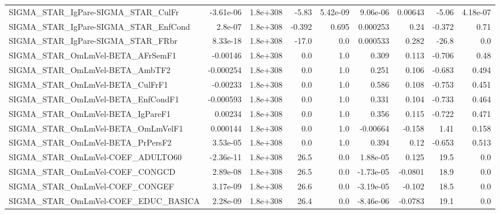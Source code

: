 \begin{tabular}{lrrrrrrrr}
SIGMA\_STAR\_IgPare-SIGMA\_STAR\_CulFr    &   -3.61e-06 &     1.8e+308 &   -5.83 & 5.42e-09 &   9.06e-06 &     0.00643 &        -5.06 &      4.18e-07 \\
SIGMA\_STAR\_IgPare-SIGMA\_STAR\_EnfCond  &     2.8e-07 &     1.8e+308 &  -0.392 &    0.695 &   0.000253 &        0.24 &       -0.372 &          0.71 \\
SIGMA\_STAR\_IgPare-SIGMA\_STAR\_FRbr     &    8.33e-18 &     1.8e+308 &   -17.0 &      0.0 &   0.000533 &       0.282 &        -26.8 &           0.0 \\
SIGMA\_STAR\_OmLmVel-BETA\_AFrSemF1      &    -0.00146 &     1.8e+308 &     0.0 &      1.0 &      0.309 &       0.113 &       -0.706 &          0.48 \\
SIGMA\_STAR\_OmLmVel-BETA\_AmbTF2        &   -0.000254 &     1.8e+308 &     0.0 &      1.0 &      0.251 &       0.106 &       -0.683 &         0.494 \\
SIGMA\_STAR\_OmLmVel-BETA\_CulFrF1       &    -0.00233 &     1.8e+308 &     0.0 &      1.0 &      0.586 &       0.108 &       -0.753 &         0.451 \\
SIGMA\_STAR\_OmLmVel-BETA\_EnfCondF1     &   -0.000593 &     1.8e+308 &     0.0 &      1.0 &      0.331 &       0.104 &       -0.733 &         0.464 \\
SIGMA\_STAR\_OmLmVel-BETA\_IgPareF1      &     0.00234 &     1.8e+308 &     0.0 &      1.0 &      0.356 &       0.115 &       -0.722 &         0.471 \\
SIGMA\_STAR\_OmLmVel-BETA\_OmLmVelF1     &    0.000144 &     1.8e+308 &     0.0 &      1.0 &   -0.00664 &      -0.158 &         1.41 &         0.158 \\
SIGMA\_STAR\_OmLmVel-BETA\_PrPersF2      &    3.53e-05 &     1.8e+308 &     0.0 &      1.0 &      0.394 &        0.12 &       -0.653 &         0.513 \\
SIGMA\_STAR\_OmLmVel-COEF\_ADULTO60      &   -2.36e-11 &     1.8e+308 &    26.5 &      0.0 &   1.88e-05 &       0.125 &         19.5 &           0.0 \\
SIGMA\_STAR\_OmLmVel-COEF\_CONGCD        &    2.89e-08 &     1.8e+308 &    26.5 &      0.0 &  -1.73e-05 &     -0.0801 &         18.9 &           0.0 \\
SIGMA\_STAR\_OmLmVel-COEF\_CONGEF        &    3.17e-09 &     1.8e+308 &    26.6 &      0.0 &  -3.19e-05 &      -0.102 &         18.5 &           0.0 \\
SIGMA\_STAR\_OmLmVel-COEF\_EDUC\_BASICA   &    2.28e-09 &     1.8e+308 &    26.4 &      0.0 &  -8.46e-06 &     -0.0783 &         19.1 &           0.0 \\

\end{tabular}
